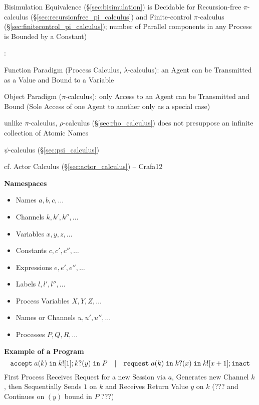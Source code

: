 Bisimulation Equivalence (\S\ref{sec:bisimulation}) is Decidable for
Recursion-free $\pi$-calculus (\S\ref{sec:recursionfree_pi_calculus})
and Finite-control $\pi$-calculus
(\S\ref{sec:finitecontrol_pi_calculus}); number of Parallel components
in any Process is Bounded by a Constant)

\cite{milner92}:

Function Paradigm (Process Calculus, $\lambda$-calculus): an Agent can
be Transmitted as a Value and Bound to a Variable

Object Paradigm ($\pi$-calculus): only Access to an Agent can be
Transmitted and Bound (Sole Access of one Agent to another only as a
special case)


\asterism


unlike $\pi$-calculus, $\rho$-calculus (\S\ref{sec:rho_calculus}) does not
presuppose an infinite collection of Atomic Names

\fist $\psi$-calculus (\S\ref{sec:psi_calculus})

\fist cf. Actor Calculus (\S\ref{sec:actor_calculus}) -- Crafa12


\asterism


\textbf{Namespaces} \cite{honda-vasconcelos-kubo98}

\begin{itemize}
\item Names $a,b,c,\ldots$
\item Channels $k,k',k'',\ldots$
\item Variables $x,y,z,\ldots$
\item Constants $c,c',c'',\ldots$
\item Expressions $e,e',e'',\ldots$
\item Labels $l,l',l'',\ldots$
\item Process Variables $X,Y,Z,\ldots$
\item Names or Channels $u, u', u'', \ldots$
\item Processes $P,Q,R, \ldots$
\end{itemize}


\textbf{Example of a Program} \cite{honda-vasconcelos-kubo98}
\[
  \mathtt{accept} \; a(k) \; \mathtt{in} \; k![1];
  k?(y) \; \mathtt{in} \; P
  \quad | \quad
  \mathtt{request} \; a(k) \; \mathtt{in} \; k?(x)
  \; \mathtt{in} \; k![x+1]; \mathtt{inact}
\]
First Process Receives Request for a new Session via $a$, Generates
new Channel $k$, then Sequentially Sends $1$ on $k$ and Receives
Return Value $y$ on $k$ (??? and Continues on $(y)$ bound in $P$ ???)

